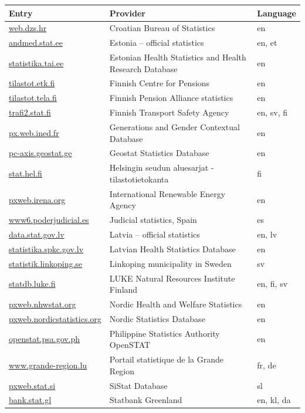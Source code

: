 \begin{table}[!htbp]
\centering
\scriptsize
\begin{tabular}{@{}>{\raggedright\arraybackslash}p{}>{\raggedright\arraybackslash}p{}>{\raggedright\arraybackslash}p{}@{}}
\toprule
Entry & Provider & Language\\
\midrule
\url{web.dzs.hr} & Croatian Bureau of Statistics & en\\
\url{andmed.stat.ee} & Estonia -- official statistics & en, et\\
\url{statistika.tai.ee} & Estonian Health Statistics and Health Research Database & en\\
\url{tilastot.etk.fi} & Finnish Centre for Pensions & en\\
\url{tilastot.tela.fi} & Finnish Pension Alliance statistics & en\\
\url{trafi2.stat.fi} & Finnish Transport Safety Agency & en, sv, fi\\
\url{px.web.ined.fr} & Generations and Gender Contextual Database & en\\
\url{pc-axis.geostat.ge} & Geostat Statistics Database & en\\
\url{stat.hel.fi} & Helsingin seudun aluesarjat -tilastotietokanta & fi\\
\url{pxweb.irena.org} & International Renewable Energy Agency & en\\
\url{www6.poderjudicial.es} & Judicial statistics, Spain & es\\
\url{data.stat.gov.lv} & Latvia -- official statistics & en, lv\\
\url{statistika.spkc.gov.lv} & Latvian Health Statistics Database & en\\
\url{statistik.linkoping.se} & Linkoping municipality in Sweden & sv\\
\url{statdb.luke.fi} & LUKE Natural Resources Institute Finland & en, fi, sv\\
\url{pxweb.nhwstat.org} & Nordic Health and Welfare Statistics & en\\
\url{pxweb.nordicstatistics.org} & Nordic Statistics Database & en\\
\url{openstat.psa.gov.ph} & Philippine Statistics Authority OpenSTAT & en\\
\url{www.grande-region.lu} & Portail statistique de la Grande Region & fr, de\\
\url{pxweb.stat.si} & SiStat Database & sl\\
\url{bank.stat.gl} & Statbank Greenland & en, kl, da\\

\end{tabular}
\end{table}
